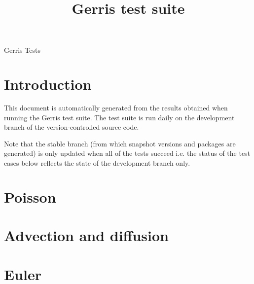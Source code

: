 \documentclass[a4paper]{article}
\title{Gerris test suite}
\begin{document}
\mbox{}\vspace{1cm}
\begin{center}
{\huge Gerris Tests}\\
\vspace{1cm}

\vspace{5mm}
\end{center}

\section{Introduction}

This document is automatically generated from the results obtained
when running the Gerris test suite. The test suite is run daily on the
development branch of the version-controlled source code. 

Note that the stable branch (from which snapshot versions and packages
are generated) is only updated when all of the tests succeed i.e. the
status of the test cases below reflects the state of the development
branch only.

\section{Poisson}










\section{Advection and diffusion}









\section{Euler}








\end{document}
